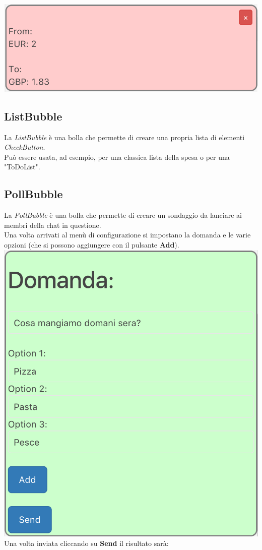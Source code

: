 \includegraphics[scale=0.75]{img/curr.png}
\subsection{ListBubble}
La \textit{ListBubble} è una bolla che permette di creare una propria lista di elementi \textit{CheckButton}. \\
Può essere usata, ad esempio, per una classica lista della spesa o per una "ToDoList".

\subsection{PollBubble}
La \textit{PollBubble} è una bolla che permette di creare un sondaggio da lanciare ai membri della chat in questione.\\
Una volta arrivati al menù di configurazione si impostano la domanda e le varie opzioni (che si possono aggiungere con il pulsante \textbf{Add}).
\\

\includegraphics[scale=0.75]{img/pollConfig.png}
\\
Una volta inviata cliccando su \textbf{Send} il risultato sarà:\\

